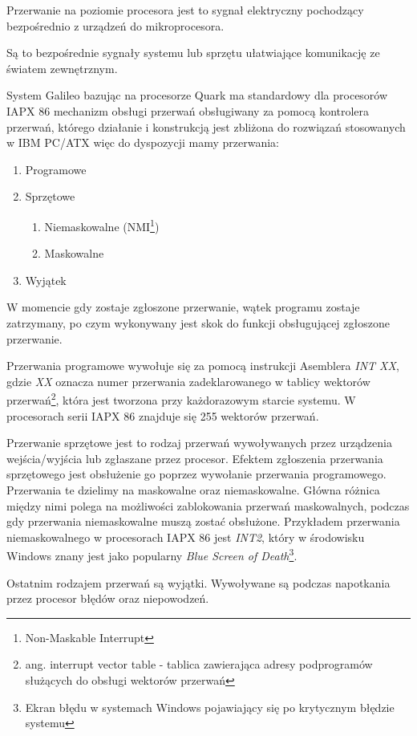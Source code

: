 \documentclass{xmgr}
\begin{document}
Przerwanie na poziomie procesora jest to sygnał elektryczny pochodzący bezpośrednio z urządzeń do mikroprocesora.

Są to bezpośrednie sygnały systemu lub sprzętu ułatwiające komunikację ze światem zewnętrznym.

System Galileo bazując na procesorze Quark ma standardowy dla procesorów IAPX 86 mechanizm obsługi przerwań obsługiwany za pomocą kontrolera przerwań, którego działanie i konstrukcją jest zbliżona do rozwiązań stosowanych w IBM PC/ATX więc do dyspozycji mamy przerwania:
\begin{enumerate}
	\item Programowe
	\item Sprzętowe
	\begin{enumerate}
		\item Niemaskowalne (NMI\footnote{Non-Maskable Interrupt})
		\item Maskowalne
	\end{enumerate}
	\item Wyjątek
\end{enumerate}

W momencie gdy zostaje zgłoszone przerwanie, wątek programu zostaje zatrzymany, po czym wykonywany jest skok do funkcji obsługującej zgłoszone przerwanie.

Przerwania programowe wywołuje się za pomocą instrukcji Asemblera \emph{INT XX}, gdzie \emph{XX} oznacza numer przerwania zadeklarowanego w tablicy wektorów przerwań\footnote{ang. interrupt vector table - tablica zawierająca adresy podprogramów służących do obsługi wektorów przerwań}, która jest tworzona przy każdorazowym starcie systemu. W procesorach serii IAPX 86 znajduje się 255 wektorów przerwań.

Przerwanie sprzętowe jest to rodzaj przerwań wywoływanych przez urządzenia wejścia/wyjścia lub zgłaszane przez procesor. Efektem zgłoszenia przerwania sprzętowego jest obsłużenie go poprzez wywołanie przerwania programowego. Przerwania te dzielimy na maskowalne oraz niemaskowalne. Główna różnica między nimi polega na możliwości zablokowania przerwań maskowalnych, podczas gdy przerwania niemaskowalne muszą zostać obsłużone. Przykładem przerwania niemaskowalnego w procesorach IAPX 86 jest \emph{INT2}, który w środowisku Windows znany jest jako popularny \emph{Blue Screen of Death}\footnote{Ekran błędu w systemach Windows pojawiający się po krytycznym błędzie systemu}.

Ostatnim rodzajem przerwań są wyjątki. Wywoływane są podczas napotkania przez procesor błędów oraz niepowodzeń.
\end{document}

